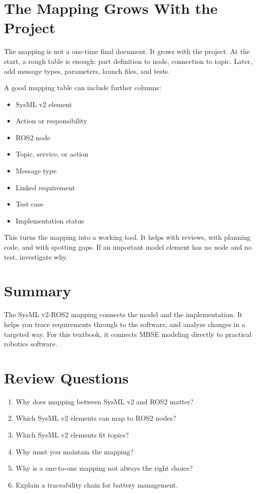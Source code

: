 \section{The Mapping Grows With the Project}
The mapping is not a one-time final document. It grows with the project. At the start, a rough table is enough: part definition to node, connection to topic. Later, add message types, parameters, launch files, and tests.

A good mapping table can include further columns:

\begin{itemize}
    \item SysML v2 element
    \item Action or responsibility
    \item ROS2 node
    \item Topic, service, or action
    \item Message type
    \item Linked requirement
    \item Test case
    \item Implementation status
\end{itemize}

This turns the mapping into a working tool. It helps with reviews, with planning code, and with spotting gaps. If an important model element has no node and no test, investigate why.

\section{Summary}
The SysML v2-ROS2 mapping connects the model and the implementation. It helps you trace requirements through to the software, and analyze changes in a targeted way. For this textbook, it connects MBSE modeling directly to practical robotics software.

\section{Review Questions}
\begin{enumerate}
    \item Why does mapping between SysML v2 and ROS2 matter?
    \item Which SysML v2 elements can map to ROS2 nodes?
    \item Which SysML v2 elements fit topics?
    \item Why must you maintain the mapping?
    \item Why is a one-to-one mapping not always the right choice?
    \item Explain a traceability chain for battery management.
\end{enumerate}

